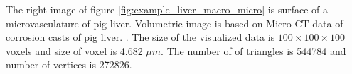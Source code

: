 The right image of figure \ref{fig:example_liver_macro_micro} is surface of a microvasculature of pig liver. 
Volumetric image is based on Micro-CT data of corrosion casts of pig liver.
\cite{eberlova2017use}.
The size of the visualized data is $100\times100\times100$ voxels and size of voxel is 4.682 $\mu{}m$.
The number of of triangles is 
544784 and number of vertices is 272826.








